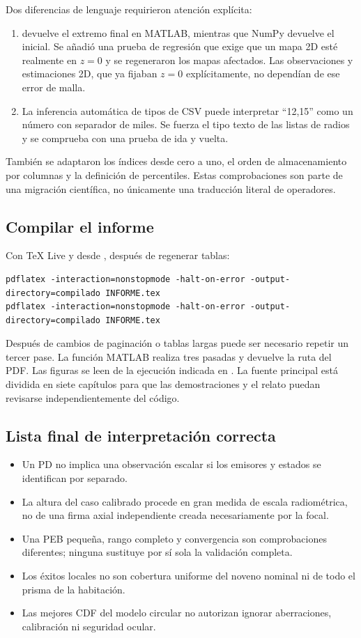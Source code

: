 Dos diferencias de lenguaje requirieron atención explícita:
\begin{enumerate}
\item {} devuelve el extremo final en MATLAB, mientras que NumPy devuelve el inicial. Se añadió una prueba de regresión que exige que un mapa 2D esté realmente en $z=0$ y se regeneraron los mapas afectados. Las observaciones y estimaciones 2D, que ya fijaban $z=0$ explícitamente, no dependían de ese error de malla.
\item La inferencia automática de tipos de CSV puede interpretar ``12,15'' como un número con separador de miles. Se fuerza el tipo texto de las listas de radios y se comprueba con una prueba de ida y vuelta.
\end{enumerate}
También se adaptaron los índices desde cero a uno, el orden de almacenamiento por columnas y la definición de percentiles. Estas comprobaciones son parte de una migración científica, no únicamente una traducción literal de operadores.

\subsection{Compilar el informe}
Con TeX Live y desde , después de regenerar tablas:
\begin{lstlisting}[language={}]
pdflatex -interaction=nonstopmode -halt-on-error -output-directory=compilado INFORME.tex
pdflatex -interaction=nonstopmode -halt-on-error -output-directory=compilado INFORME.tex
\end{lstlisting}
Después de cambios de paginación o tablas largas puede ser necesario repetir un tercer pase. La función MATLAB  realiza tres pasadas y devuelve la ruta del PDF. Las figuras se leen de la ejecución indicada en . La fuente principal está dividida en siete capítulos para que las demostraciones y el relato puedan revisarse independientemente del código.

\subsection{Lista final de interpretación correcta}
\begin{itemize}
\item Un PD no implica una observación escalar si los emisores y estados se identifican por separado.
\item La altura del caso calibrado procede en gran medida de escala radiométrica, no de una firma axial independiente creada necesariamente por la focal.
\item Una PEB pequeña, rango completo y convergencia son comprobaciones diferentes; ninguna sustituye por sí sola la validación completa.
\item Los éxitos locales no son cobertura uniforme del noveno nominal ni de todo el prisma de la habitación.
\item Las mejores CDF del modelo circular no autorizan ignorar aberraciones, calibración ni seguridad ocular.
\end{itemize}
